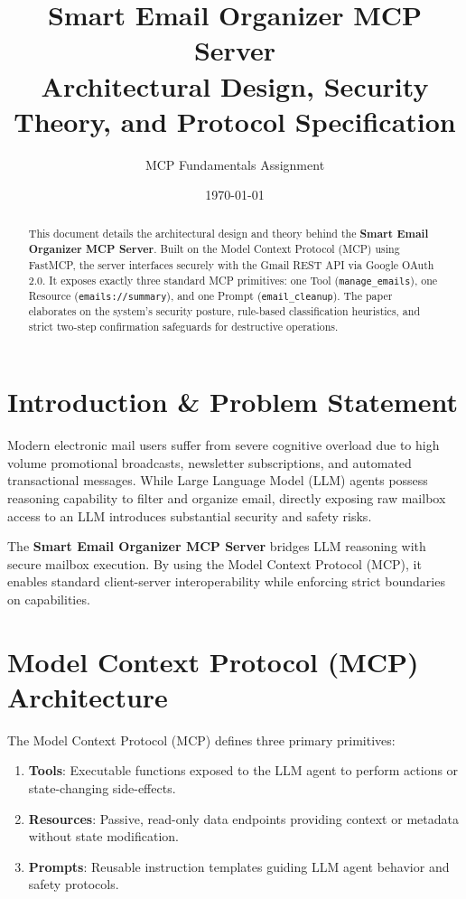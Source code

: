 \documentclass[11pt,a4paper]{article}
\title{\textbf{Smart Email Organizer MCP Server}\\ \large Architectural Design, Security Theory, and Protocol Specification}
\author{MCP Fundamentals Assignment}
\date{\today}
\begin{document}
\maketitle

\begin{abstract}
This document details the architectural design and theory behind the \textbf{Smart Email Organizer MCP Server}. Built on the Model Context Protocol (MCP) using FastMCP, the server interfaces securely with the Gmail REST API via Google OAuth 2.0. It exposes exactly three standard MCP primitives: one Tool (\texttt{manage\_emails}), one Resource (\texttt{emails://summary}), and one Prompt (\texttt{email\_cleanup}). The paper elaborates on the system's security posture, rule-based classification heuristics, and strict two-step confirmation safeguards for destructive operations.
\end{abstract}

\tableofcontents
\newpage

\section{Introduction \& Problem Statement}
Modern electronic mail users suffer from severe cognitive overload due to high volume promotional broadcasts, newsletter subscriptions, and automated transactional messages. While Large Language Model (LLM) agents possess reasoning capability to filter and organize email, directly exposing raw mailbox access to an LLM introduces substantial security and safety risks.

The \textbf{Smart Email Organizer MCP Server} bridges LLM reasoning with secure mailbox execution. By using the Model Context Protocol (MCP), it enables standard client-server interoperability while enforcing strict boundaries on capabilities.

\section{Model Context Protocol (MCP) Architecture}
The Model Context Protocol (MCP) defines three primary primitives:
\begin{enumerate}
    \item \textbf{Tools}: Executable functions exposed to the LLM agent to perform actions or state-changing side-effects.
    \item \textbf{Resources}: Passive, read-only data endpoints providing context or metadata without state modification.
    \item \textbf{Prompts}: Reusable instruction templates guiding LLM agent behavior and safety protocols.
\end{enumerate}
\end{document}
